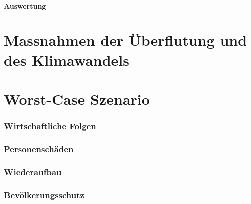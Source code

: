 \subsection{Auswertung}
 
\newpage
\part{Massnahmen der Überflutung und des Klimawandels}


 


   

\newpage

\part{Worst-Case Szenario}
\section{Wirtschaftliche Folgen}
\newpage
\section{Personenschäden}
\newpage
\section{Wiederaufbau}
\newpage
\section{Bevölkerungsschutz}


 